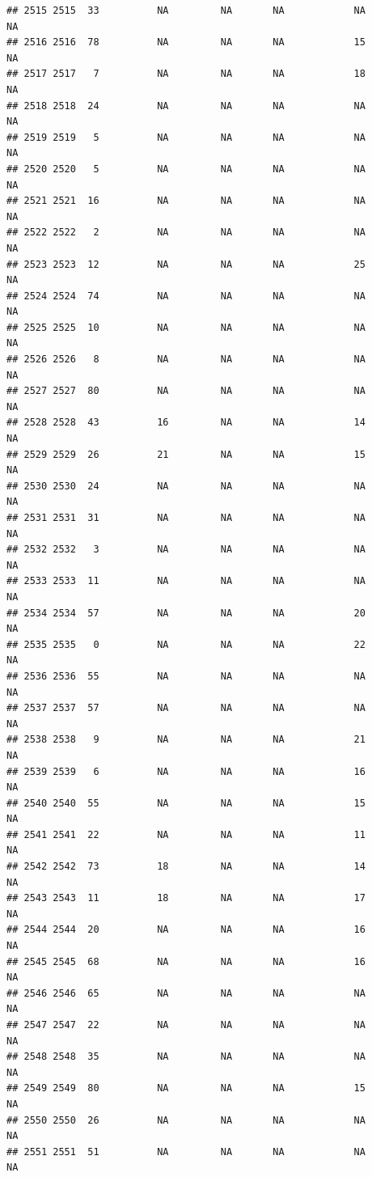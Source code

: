 \documentclass[man]{apa6}
\begin{document}
\begin{verbatim}
## 2515 2515  33          NA         NA       NA            NA       NA
## 2516 2516  78          NA         NA       NA            15       NA
## 2517 2517   7          NA         NA       NA            18       NA
## 2518 2518  24          NA         NA       NA            NA       NA
## 2519 2519   5          NA         NA       NA            NA       NA
## 2520 2520   5          NA         NA       NA            NA       NA
## 2521 2521  16          NA         NA       NA            NA       NA
## 2522 2522   2          NA         NA       NA            NA       NA
## 2523 2523  12          NA         NA       NA            25       NA
## 2524 2524  74          NA         NA       NA            NA       NA
## 2525 2525  10          NA         NA       NA            NA       NA
## 2526 2526   8          NA         NA       NA            NA       NA
## 2527 2527  80          NA         NA       NA            NA       NA
## 2528 2528  43          16         NA       NA            14       NA
## 2529 2529  26          21         NA       NA            15       NA
## 2530 2530  24          NA         NA       NA            NA       NA
## 2531 2531  31          NA         NA       NA            NA       NA
## 2532 2532   3          NA         NA       NA            NA       NA
## 2533 2533  11          NA         NA       NA            NA       NA
## 2534 2534  57          NA         NA       NA            20       NA
## 2535 2535   0          NA         NA       NA            22       NA
## 2536 2536  55          NA         NA       NA            NA       NA
## 2537 2537  57          NA         NA       NA            NA       NA
## 2538 2538   9          NA         NA       NA            21       NA
## 2539 2539   6          NA         NA       NA            16       NA
## 2540 2540  55          NA         NA       NA            15       NA
## 2541 2541  22          NA         NA       NA            11       NA
## 2542 2542  73          18         NA       NA            14       NA
## 2543 2543  11          18         NA       NA            17       NA
## 2544 2544  20          NA         NA       NA            16       NA
## 2545 2545  68          NA         NA       NA            16       NA
## 2546 2546  65          NA         NA       NA            NA       NA
## 2547 2547  22          NA         NA       NA            NA       NA
## 2548 2548  35          NA         NA       NA            NA       NA
## 2549 2549  80          NA         NA       NA            15       NA
## 2550 2550  26          NA         NA       NA            NA       NA
## 2551 2551  51          NA         NA       NA            NA       NA

\end{verbatim}
\end{document}
